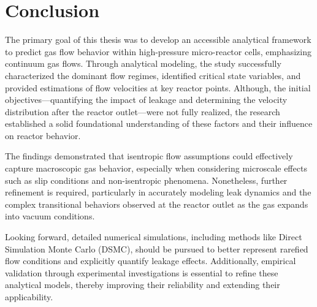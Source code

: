 \section*{Conclusion}
The primary goal of this thesis was to develop an accessible analytical framework to predict gas flow behavior within high-pressure micro-reactor cells, emphasizing continuum gas flows.
Through analytical modeling, the study successfully characterized the dominant flow regimes, identified critical state variables, and provided estimations of flow velocities at key reactor points.
Although, the initial objectives—quantifying the impact of leakage and determining the velocity distribution after the reactor outlet—were not fully realized, the research established a solid foundational understanding of these factors and their influence on reactor behavior.

The findings demonstrated that isentropic flow assumptions could effectively capture macroscopic gas behavior, especially when considering microscale effects such as slip conditions and non-isentropic phenomena.
Nonetheless, further refinement is required, particularly in accurately modeling leak dynamics and the complex transitional behaviors observed at the reactor outlet as the gas expands into vacuum conditions.

Looking forward, detailed numerical simulations, including methods like Direct Simulation Monte Carlo (DSMC), should be pursued to better represent rarefied flow conditions and explicitly quantify leakage effects.
Additionally, empirical validation through experimental investigations is essential to refine these analytical models, thereby improving their reliability and extending their applicability.
